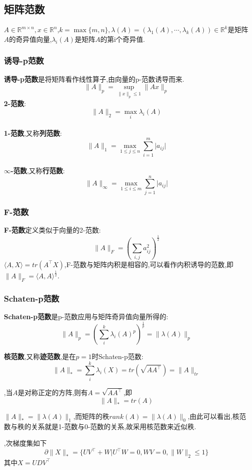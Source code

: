 \documentclass[UTF8]{ctexart}
\newcommand{\s}{\quad}
\renewcommand{\b}{\textbf}
\newcommand{\p}{\paragraph{}\s}
\newcommand{\ssect}{\subsection}
\newcommand{\sssect}{\subsubsection}
\newcommand{\equ}[1]{\begin{equation}#1\end{equation}}
\newcommand{\abs}[1]{\lvert#1\rvert}
\newcommand{\norm}[1]{\lVert#1\rVert}
\newcommand{\inprod}[1]{\langle#1\rangle}
\newcommand{\Real}[1]{\mathbb{R}^{#1}}
\newcommand{\nunorm}{\norm{X}_*}
\numberwithin{equation}{section}
\begin{document}
		\ssect{矩阵范数}
		$A\in\Real{m\times n},x\in\Real{n}$,$k=\max\{m,n\},\lambda(A)=(\lambda_1(A),\cdots,\lambda_k(A))\in\Real{k}$是矩阵$A$的奇异值向量,$\lambda_i(A)$是矩阵$A$的第i个奇异值.
		\sssect{诱导-p范数}
		\b{诱导-p范数}是将矩阵看作线性算子,由向量的p-范数诱导而来.
		\[\norm{A}_p=\sup_{\norm{x}_p\leq1}\norm{Ax}_p\]
		\b{2-范数}:
		\[\norm{A}_2=\max_i\lambda_i(A)\]

		\p\b{1-范数},又称\b{列范数}:
		\[\norm{A}_1=\max_{1\leq j\leq n}\sum_{i=1}^m\abs{a_{ij}}\]

		\p\b{$\infty$-范数},又称\b{行范数}:
		\[\norm{A}_\infty=\max_{1\leq i\leq m}\sum_{j=1}^n\abs{a_{ij}}\]

		\sssect{F-范数}
		\b{F-范数}定义类似于向量的2-范数:
		\[\norm{A}_F=(\sum_{i,j}a_{ij}^2)^{\frac{1}{2}}\]
		$\inprod{A,X}=tr(A^\top X)$,F-范数与矩阵内积是相容的,可以看作内积诱导的范数,即$\norm{A}_F=\inprod{A,A}^{\frac{1}{2}}$.

		\sssect{Schaten-p范数}
		\b{Schaten-p范数}是p-范数应用与矩阵奇异值向量所得的:
		\[\norm{A}_p=(\sum_i^k\lambda_i(A)^p)^{\frac{1}{p}}=\norm{\lambda(A)}_p\]

		\b{核范数},又称\b{迹范数},是在$p=1$时Schaten-p范数:
		\[\norm{A}_*=\sum_i^k\lambda_i(X)=tr(\sqrt{AA^\top})=\norm{A}_{tr}\]


		,当$A$是对称正定的方阵,则有$A=\sqrt{AA^\top}$,即
		\[\norm{A}_*=tr(A)\]

		$\norm{A}_*=\norm{\lambda(A)}_1$,而矩阵的秩$rank(A)=\norm{\lambda(A)}_0$,由此可以看出,核范数与秩的关系就是1-范数与0-范数的关系,故采用核范数来近似秩.

		,次梯度集如下
		\equ{\partial\nunorm=\{UV^\top+W\vert U^\top W=0,WV=0,\norm{W}_2\leq1\}}
		其中$X=UDV^\top$
\end{document}
